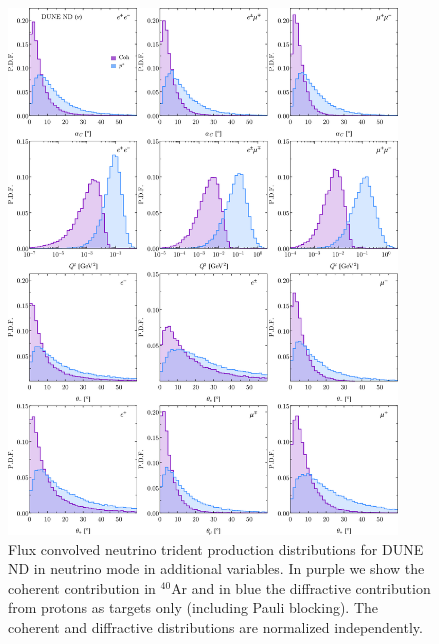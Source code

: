 \begin{figure}[H]
\centering
\includegraphics[width=0.92\textwidth]{figs/DUNE_nu_3horn_aC_Q2_thetapm.pdf}
\caption{Flux convolved neutrino trident production distributions for DUNE ND in neutrino mode in additional variables. In purple we show the coherent contribution in $^{40}$Ar and in blue the diffractive contribution from protons as targets only (including Pauli blocking). The coherent and diffractive distributions are normalized independently. \label{fig:other_dists}}
\end{figure}
%